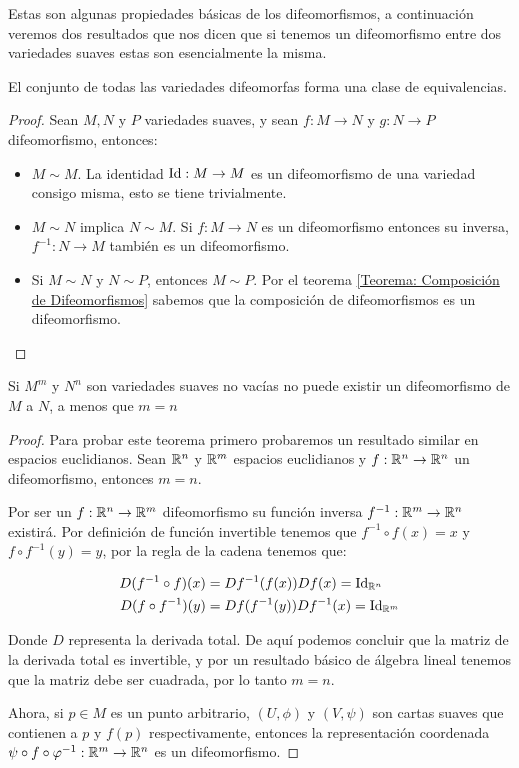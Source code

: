 Estas son algunas propiedades básicas de los difeomorfismos, a continuación veremos dos resultados que nos dicen que si tenemos un difeomorfismo entre dos variedades suaves estas son esencialmente la misma.

\begin{theorem}
  El conjunto de todas las variedades difeomorfas forma una clase de equivalencias. 
\end{theorem}

\begin{proof} Sean $M,N$ y $P$ variedades suaves, y sean $f: M \to N$ y $g: N \to P$ difeomorfismo, entonces:
  \begin{itemize}
    \item $M \sim M$. La identidad $\mathrm{Id}: M \to M$ es un difeomorfismo de una variedad consigo misma, esto se tiene trivialmente.
    \item $M \sim N$ implica $N \sim M$. Si $f: M \to N$ es un difeomorfismo entonces su inversa, $f^{-1}: N \to M$ también es un difeomorfismo.
    \item Si $M \sim N$ y $N \sim P$, entonces $M \sim P$. Por el teorema \ref{Teorema: Composición de Difeomorfismos} sabemos que la composición de difeomorfismos es un difeomorfismo.
  \end{itemize}
\end{proof}

\begin{theorem}
  Si $M^m$ y $N^n$ son variedades suaves no vacías no puede existir un difeomorfismo de $M$ a $N$, a menos que $m=n$
\end{theorem}

\begin{proof}
  Para probar este teorema primero probaremos un resultado similar en espacios euclidianos. Sean $\mathbb{R}^n$ y $\mathbb{R}^m$ espacios euclidianos y $f: \mathbb{R}^n \to \mathbb{R}^n$ un difeomorfismo, entonces $m = n$.

  Por ser un $f: \mathbb{R}^n \to \mathbb{R}^m$ difeomorfismo su función inversa  $f^{-1}: \mathbb{R}^m \to \mathbb{R}^n$ existirá. Por definición de función invertible tenemos que $f^{-1} \circ f (x) = x$ y $f \circ f^{-1}(y) = y$, por la regla de la cadena tenemos que:

  \begin{align*}
    D(f^{-1} \circ f)(x) &= Df^{-1}(f(x))Df(x) = \mathrm{Id}_{\mathbb{R}^n}\\
    D(f \circ f^{-1})(y) &= Df(f^{-1}(y))Df^{-1}(x) = \mathrm{Id}_{\mathbb{R}^m}
  \end{align*}

  Donde $D$ representa la derivada total. De aquí podemos concluir que la matriz de la derivada total es invertible, y por un resultado básico de álgebra lineal tenemos que la matriz debe ser cuadrada, por lo tanto $m = n$.

  Ahora, si $p \in M$ es un punto arbitrario, $(U,\phi)$ y $(V,\psi)$ son cartas suaves que contienen a $p$ y $f(p)$ respectivamente, entonces la representación coordenada $\psi \circ f \circ \varphi^{-1}: \mathbb{R}^m \to \mathbb{R}^n$ es un difeomorfismo. 
\end{proof}

